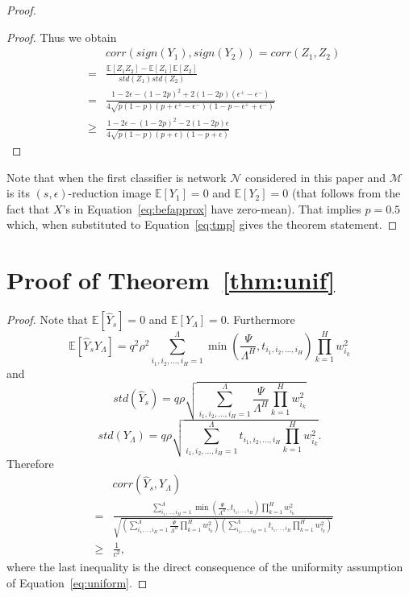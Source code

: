 \documentclass[twoside]{article}
\begin{document}
\begin{proof}
\begin{proof}
Thus we obtain
\begin{eqnarray}
&&\!\!\!\!\!\!\!\!\!\!\!\!\!\!\!corr(sign(Y_1),sign(Y_2)) = corr(Z_1,Z_2) \nonumber\\
&\!\!\!\!\!\!\!\!\!\!\!\!\!\!\!=& \!\!\!\!\!\!\!\!\!\!\frac{\mathbb{E}[Z_1Z_2] - \mathbb{E}[Z_1]\mathbb{E}[Z_2]}{std(Z_1)std(Z_2)} \nonumber\\
&\!\!\!\!\!\!\!\!\!\!\!\!\!\!\!=& \!\!\!\!\!\!\!\!\!\!\frac{1 - 2\epsilon - (1 - 2p)^2 + 2(1 - 2p)(\epsilon^{+} - \epsilon^{-})}{4\sqrt{p(1 - p)(p + \epsilon^{+} - \epsilon^{-})(1 - p - \epsilon^{+} + \epsilon^{-})}} \nonumber\\
&\!\!\!\!\!\!\!\!\!\!\!\!\!\!\!\geq& \!\!\!\!\!\!\!\!\!\!\frac{1 - 2\epsilon - (1 - 2p)^2 - 2(1 - 2p)\epsilon}{4\sqrt{p(1 - p)(p + \epsilon)(1 - p + \epsilon)}}
\label{eq:tmp}
\end{eqnarray}
\end{proof}
Note that when the first classifier is network $\mathcal{N}$ considered in this paper and $\mathcal{M}$ is its $(s,\epsilon)$-reduction image $\mathbb{E}[Y_1] = 0$ and $\mathbb{E}[Y_2] = 0$ (that follows from the fact that $X$'s in Equation~\ref{eq:befapprox} have zero-mean). That implies $p=0.5$ which, when substituted to Equation~\ref{eq:tmp} gives the theorem statement.
\end{proof}

\section{Proof of Theorem~\ref{thm:unif}}
\begin{proof}
Note that $\mathbb{E}[\hat{Y}_s] = 0$ and $\mathbb{E}[Y_{\Lambda}] = 0$. Furthermore
\[\mathbb{E}[\hat{Y}_sY_{\Lambda}] = q^2\rho^2\!\!\!\sum_{i_1,i_2,\dots,i_H=1}^{\Lambda}\!\!\!\min\left(\frac{\Psi}{\Lambda^H},t_{i_1,i_2,\dots,i_H}\right)\prod_{k = 1}^{H}w_{i_k}^2
\]
and
\[std(\hat{Y}_s) = q\rho\sqrt{\sum_{i_1,i_2,\dots,i_H=1}^{\Lambda}\frac{\Psi}{\Lambda^H}\prod_{k = 1}^{H}w_{i_k}^2}
\]
\[std(Y_{\Lambda}) = q\rho\sqrt{\sum_{i_1,i_2,\dots,i_H=1}^{\Lambda}t_{i_1,i_2,\dots,i_H}\prod_{k = 1}^{H}w_{i_k}^2}.
\]
Therefore
\begin{eqnarray*}
&&\!\!\!\!\!\!\!\!\!corr(\hat{Y}_s,Y_{\Lambda})\\ 
&\!\!\!\!\!\!\!\!\!=&\!\!\!\!\!\!\! \frac{\displaystyle\sum_{i_1,\dots,i_H=1}^{\Lambda}\min\left(\frac{\Psi}{\Lambda^H},t_{i_1,\dots,i_H}\right)\prod_{k = 1}^{H}w_{i_k}^2}{\sqrt{\!\!\!\left(\displaystyle\sum_{i_1,\dots,i_H=1}^{\Lambda}\frac{\Psi}{\Lambda^H}\prod_{k = 1}^{H}w_{i_k}^2\right)\!\!\!\!\left(\displaystyle\sum_{i_1,\dots,i_H=1}^{\Lambda}\!\!\!\!\!t_{i_1,\dots,i_H}\prod_{k = 1}^{H}w_{i_k}^2\right)}}\\
&\!\!\!\!\!\!\!\!\geq& \frac{1}{c^2}, 
\end{eqnarray*}
where the last inequality is the direct consequence of the uniformity assumption of Equation~\ref{eq:uniform}.
\end{proof}
\end{document}
